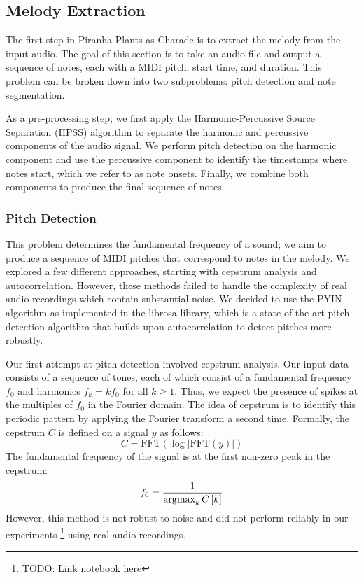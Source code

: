 \subsection{Melody Extraction}
\label{sec:melody_extraction}

The first step in Piranha Plants as Charade is to extract the melody from the input audio. The goal of this section is to take an audio file and output a sequence of notes, each with a MIDI pitch, start time, and duration. This problem can be broken down into two subproblems: pitch detection and note segmentation.

As a pre-processing step, we first apply the Harmonic-Percussive Source Separation (HPSS) algorithm \autocite{HPSS:2010,HPSS:2014} to separate the harmonic and percussive components of the audio signal. We perform pitch detection on the harmonic component and use the percussive component to identify the timestamps where notes start, which we refer to as note onsets. Finally, we combine both components to produce the final sequence of notes.

\subsubsection{Pitch Detection}

This problem determines the fundamental frequency of a sound; we aim to produce a sequence of MIDI pitches that correspond to notes in the melody. We explored a few different approaches, starting with cepstrum analysis and autocorrelation. However, these methods failed to handle the complexity of real audio recordings which contain substantial noise. We decided to use the PYIN algorithm as implemented in the librosa library, which is a state-of-the-art pitch detection algorithm that builds upon autocorrelation to detect pitches more robustly.


Our first attempt at pitch detection involved cepstrum analysis. Our input data consists of a sequence of tones, each of which consist of a fundamental frequency $f_0$ and harmonics $f_k = k f_0$ for all $k \geq 1$. Thus, we expect the presence of spikes at the multiples of $f_0$ in the Fourier domain. The idea of cepstrum is to identify this periodic pattern by applying the Fourier transform a second time. Formally, the cepstrum $C$ is defined on a signal $y$ as follows:
$$C = \text{FFT}\left(\log\left|\text{FFT}\left(y\right)\right|\right)$$
The fundamental frequency of the signal is at the first non-zero peak in the cepstrum:
$$f_0 = \frac{1}{\operatorname*{\arg\!\max}_{k} C\left[k\right]}$$
However, this method is not robust to noise and did not perform reliably in our experiments \footnote{TODO: Link notebook here} using real audio recordings.

